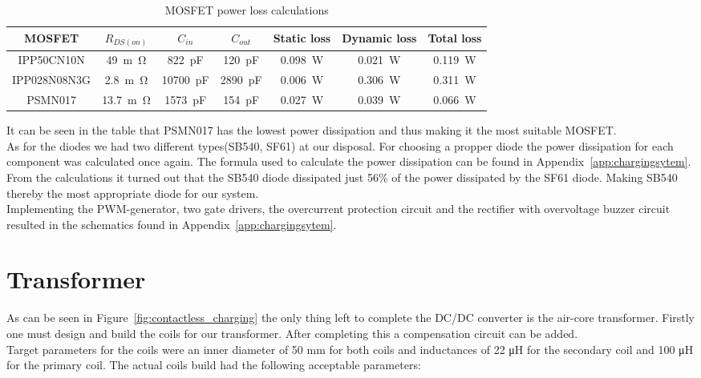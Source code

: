 \documentclass[11pt,titlepage]{report}
\begin{document}
\begin{table}[H]
	\centering
	\begin{tabular}{c c c c c c c}
		\hline\hline
		MOSFET & $R_{DS(on)}$ & $C_{in}$ & $C_{out}$ & Static loss & Dynamic loss & Total loss \\
		\hline
		IPP50CN10N & \SI{49}{m\ohm} & \SI{822}{pF} & \SI{120}{pF} & \SI{0.098}{W} & \SI{0.021}{W} & \SI{0.119}{W} \\
		IPP028N08N3G & \SI{2.8}{m\ohm} & \SI{10700}{pF} & \SI{2890}{pF} & \SI{0.006}{W} & \SI{0.306}{W} & \SI{0.311}{W} \\
		PSMN017 & \SI{13.7}{m\ohm} & \SI{1573}{pF} & \SI{154}{pF} & \SI{0.027}{W} & \SI{0.039}{W} & \SI{0.066}{W} \\
		\hline
		\end{tabular}
		\caption{MOSFET power loss calculations}
	    \label{ass2_power_loss}
\end{table}

It can be seen in the table that PSMN017 has the lowest power dissipation and thus making it the most suitable MOSFET. \\ 
As for the diodes we had two different types(SB540, SF61) at our disposal. For choosing a propper diode the power dissipation for each component was calculated once again. The formula used to calculate the power dissipation can be found in Appendix~\ref{app:chargingsytem}. From the calculations it turned out that the SB540 diode dissipated just 56\% of the power dissipated by the SF61 diode. Making SB540 thereby the most appropriate diode for our system. \\ 
Implementing the PWM-generator, two gate drivers, the overcurrent protection circuit and the rectifier
with overvoltage buzzer circuit resulted in the schematics found in Appendix~\ref{app:chargingsytem}. 


\section{Transformer}
As can be seen in Figure~\ref{fig:contactless_charging} the only thing left to complete the DC/DC converter is the air-core transformer. Firstly one must design and build the coils for our transformer. After completing this a compensation circuit can be added. \\
Target parameters for the coils were an inner diameter of 50 mm for both coils and inductances of 22 μH for the secondary coil and 100 μH for the primary coil. The actual coils build had the following acceptable parameters:
\end{document}
